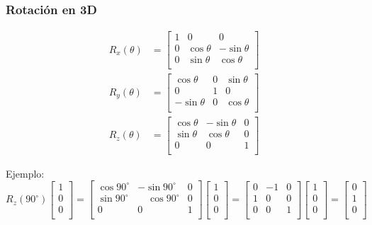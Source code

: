 \begin{frame}
    \frametitle{Rotación en 3D}
    \small
    \begin{equation*}
        {\displaystyle {\begin{alignedat}{1}R_{x}(\theta )&={\begin{bmatrix}1&0&0\\0&\cos \theta &-\sin \theta \\[3pt]0&\sin \theta     &\cos \theta \\[3pt]\end{bmatrix}}\\
        R_{y}(\theta )&={\begin{bmatrix}\cos \theta &0&\sin \theta \\[3pt]0&1&0\\[3pt]-\sin \theta &0&\cos \theta \\
        \end{bmatrix}}\\
        R_{z}(\theta )&={\begin{bmatrix}\cos \theta &-\sin \theta &0\\[3pt]\sin \theta &\cos \theta &0\\[3pt]0&0&1\\\end{bmatrix}}\end{alignedat}}
        }
    \end{equation*}

Ejemplo:
    \begin{equation*}
        {\displaystyle R_{z}(90^{\circ }){\begin{bmatrix}1\\0\\0\\\end{bmatrix}}={\begin{bmatrix}\cos 90^{\circ }&-\sin 90^{\circ }&0\\\sin 90^{\circ }&\quad \cos 90^{\circ }&0\\0&0&1\\\end{bmatrix}}{\begin{bmatrix}1\\0\\0\\\end{bmatrix}}={\begin{bmatrix}0&-1&0\\1&0&0\\0&0&1\\\end{bmatrix}}{\begin{bmatrix}1\\0\\0\\\end{bmatrix}}={\begin{bmatrix}0\\1\\0\\\end{bmatrix}}}
    \end{equation*}

\end{frame}

